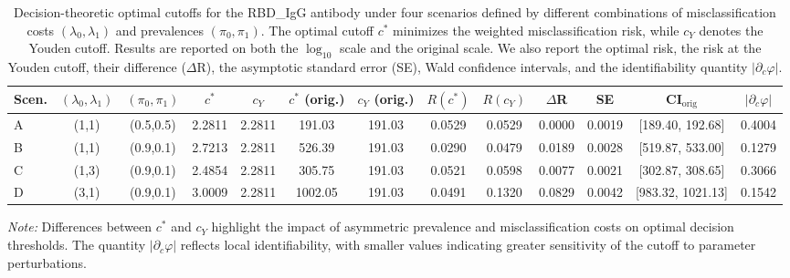 \documentclass[11pt,a4paper]{article}
\theoremstyle{definition}
\theoremstyle{remark}
\newcommand{\1}{\mathbf{1}}
\begin{document}
\begin{table}[h!]
\centering
\caption{
Decision-theoretic optimal cutoffs for the RBD\_IgG antibody under four scenarios defined by different combinations of misclassification costs $(\lambda_0,\lambda_1)$ and prevalences $(\pi_0,\pi_1)$. 
The optimal cutoff $c^*$ minimizes the weighted misclassification risk, while $c_Y$ denotes the Youden cutoff. 
Results are reported on both the $\log_{10}$ scale and the original scale. 
We also report the optimal risk, the risk at the Youden cutoff, their difference ($\Delta$R), the asymptotic standard error (SE), Wald confidence intervals, and the identifiability quantity $|\partial_c \varphi|$.
\label{tab:RBD_decision}
}

\scriptsize
\setlength{\tabcolsep}{3pt}
\renewcommand{\arraystretch}{0.9}

\begin{tabular*}{\textwidth}{@{\extracolsep\fill}l c c c c c c c c c c c c @{\extracolsep\fill}}
\toprule
\textbf{Scen.} & $(\lambda_0,\lambda_1)$ & $(\pi_0,\pi_1)$ & $c^*$ & $c_Y$ & $c^*$ (orig.) & $c_Y$ (orig.) & $R(c^*)$ & $R(c_Y)$ & $\Delta$R & SE & CI$_{\text{orig}}$ & $|\partial_c \varphi|$ \\
\midrule

A & (1,1) & (0.5,0.5) & 2.2811 & 2.2811 & 191.03 & 191.03 & 0.0529 & 0.0529 & 0.0000 & 0.0019 & [189.40, 192.68] & 0.4004 \\

B & (1,1) & (0.9,0.1) & 2.7213 & 2.2811 & 526.39 & 191.03 & 0.0290 & 0.0479 & 0.0189 & 0.0028 & [519.87, 533.00] & 0.1279 \\

C & (1,3) & (0.9,0.1) & 2.4854 & 2.2811 & 305.75 & 191.03 & 0.0521 & 0.0598 & 0.0077 & 0.0021 & [302.87, 308.65] & 0.3066 \\

D & (3,1) & (0.9,0.1) & 3.0009 & 2.2811 & 1002.05 & 191.03 & 0.0491 & 0.1320 & 0.0829 & 0.0042 & [983.32, 1021.13] & 0.1542 \\

\bottomrule
\end{tabular*}

\begin{tablenotes}
\item {\it Note:} Differences between $c^*$ and $c_Y$ highlight the impact of asymmetric prevalence and misclassification costs on optimal decision thresholds. The quantity $|\partial_c \varphi|$ reflects local identifiability, with smaller values indicating greater sensitivity of the cutoff to parameter perturbations.
\end{tablenotes}

\end{table}
\end{document}
